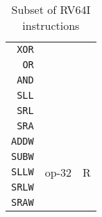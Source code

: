 \begin{table}
\begin{tabular}[t]{r|l|l}
        \texttt{XOR}  &                                             \\
        \texttt{OR}   &                                             \\
        \texttt{AND}  &                                             \\
        \texttt{SLL}  &                                             \\
        \texttt{SRL}  &                                             \\
        \texttt{SRA}  &                                             \\
        \hline
        \texttt{ADDW} & \multirow{5}{*}{op-32} & \multirow{5}{*}{R} \\
        \texttt{SUBW} &                                             \\
        \texttt{SLLW} &                                             \\
        \texttt{SRLW} &                                             \\
        \texttt{SRAW} &                                             \\
        \hline
    \end{tabular}
    \caption[RV64I Instruction Subset]{Subset of RV64I instructions }
    \label{tab:rv64i-instructions}
\end{table}